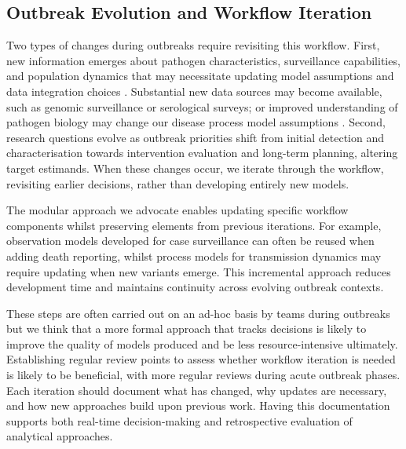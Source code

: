 \documentclass{article}
\begin{document}
\subsection{Outbreak Evolution and Workflow Iteration}  \label{sec:outbreak}
Two types of changes during outbreaks require revisiting this workflow.
First, new information emerges about pathogen characteristics, surveillance capabilities, and population dynamics that may necessitate updating model assumptions and data integration choices \citep{mccaw2023role}. Substantial new data sources may become available, such as genomic surveillance or serological surveys; or improved understanding of pathogen biology may change our disease process model assumptions \citep{knock2021key}. 
Second, research questions evolve as outbreak priorities shift from initial detection and characterisation towards intervention evaluation and long-term planning, altering target estimands.
When these changes occur, we iterate through the workflow, revisiting earlier decisions, rather than developing entirely new models.

The modular approach we advocate enables updating specific workflow components whilst preserving elements from previous iterations.
For example, observation models developed for case surveillance can often be reused when adding death reporting, whilst process models for transmission dynamics may require updating when new variants emerge.
This incremental approach reduces development time and maintains continuity across evolving outbreak contexts.

These steps are often carried out on an ad-hoc basis by teams during outbreaks but we think that a more formal approach that tracks decisions is likely to improve the quality of models produced and be less resource-intensive ultimately.
Establishing regular review points to assess whether workflow iteration is needed is likely to be beneficial, with more regular reviews during acute outbreak phases.
Each iteration should document what has changed, why updates are necessary, and how new approaches build upon previous work.
Having this documentation supports both real-time decision-making and retrospective evaluation of analytical approaches.
\end{document}
